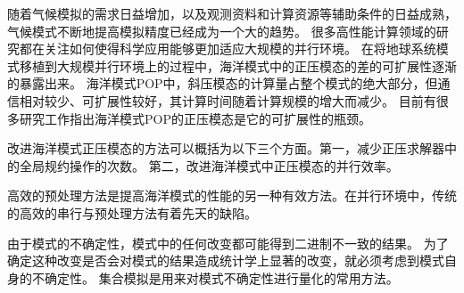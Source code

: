 随着气候模拟的需求日益增加，以及观测资料和计算资源等辅助条件的日益成熟，气候模式不断地提高模拟精度已经成为一个大的趋势。
很多高性能计算领域的研究都在关注如何使得科学应用能够更加适应大规模的并行环境。 
在将地球系统模式移植到大规模并行环境上的过程中，海洋模式中的正压模态的差的可扩展性逐渐的暴露出来。 
海洋模式POP中，斜压模态的计算量占整个模式的绝大部分，但通信相对较少、可扩展性较好，其计算时间随着计算规模的增大而减少。
目前有很多研究工作指出海洋模式POP的正压模态是它的可扩展性的瓶颈。


改进海洋模式正压模态的方法可以概括为以下三个方面。第一，减少正压求解器中的全局规约操作的次数。
第二，改进海洋模式中正压模态的并行效率。 
 

高效的预处理方法是提高海洋模式的性能的另一种有效方法。在并行环境中，传统的高效的串行与预处理方法有着先天的缺陷。

由于模式的不确定性，模式中的任何改变都可能得到二进制不一致的结果。
为了确定这种改变是否会对模式的结果造成统计学上显著的改变，就必须考虑到模式自身的不确定性。
集合模拟是用来对模式不确定性进行量化的常用方法。 




